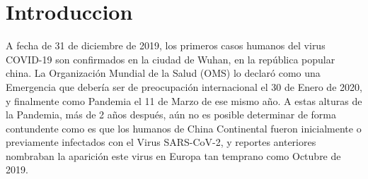 
\section{Introduccion}
A fecha de 31 de diciembre de 2019, los primeros casos humanos del virus COVID-19 son confirmados en la ciudad de Wuhan, en la república popular china. La Organización Mundial de la Salud (OMS) lo declaró como una Emergencia que debería ser de preocupación internacional el 30 de Enero de 2020, y finalmente como Pandemia el 11 de Marzo de ese mismo año. A estas alturas de la Pandemia, más de 2 años después, aún no es posible determinar de forma contundente como es que los humanos de China Continental fueron inicialmente o previamente infectados con el Virus SARS-CoV-2, y reportes anteriores nombraban la aparición este virus en Europa tan temprano como Octubre de 2019.\cite{sakay_2021}